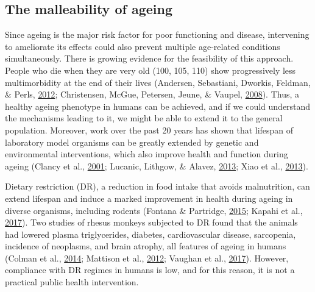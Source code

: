 \documentclass[12pt,twoside]{unicam}
\begin{document}
\hypertarget{the-malleability-of-ageing}{%
\subsection{The malleability of ageing}\label{the-malleability-of-ageing}}

Since ageing is the major risk factor for poor functioning and disease, intervening to ameliorate its effects could also prevent multiple age-related conditions simultaneously. There is growing evidence for the feasibility of this approach. People who die when they are very old (100, 105, 110) show progressively less multimorbidity at the end of their lives (Andersen, Sebastiani, Dworkis, Feldman, \& Perls, \protect\hyperlink{ref-Andersen2012}{2012}; Christensen, McGue, Petersen, Jeune, \& Vaupel, \protect\hyperlink{ref-Christensen2008}{2008}). Thus, a healthy ageing phenotype in humans can be achieved, and if we could understand the mechanisms leading to it, we might be able to extend it to the general population. Moreover, work over the past 20 years has shown that lifespan of laboratory model organisms can be greatly extended by genetic and environmental interventions, which also improve health and function during ageing (Clancy et al., \protect\hyperlink{ref-Clancy2001}{2001}; Lucanic, Lithgow, \& Alavez, \protect\hyperlink{ref-Lucanic2013}{2013}; Xiao et al., \protect\hyperlink{ref-Xiao2013}{2013}).

Dietary restriction (DR), a reduction in food intake that avoids malnutrition, can extend lifespan and induce a marked improvement in health during ageing in diverse organisms, including rodents (Fontana \& Partridge, \protect\hyperlink{ref-Fontana2015}{2015}; Kapahi et al., \protect\hyperlink{ref-Kapahi2017}{2017}). Two studies of rhesus monkeys subjected to DR found that the animals had lowered plasma triglycerides, diabetes, cardiovascular disease, sarcopenia, incidence of neoplasms, and brain atrophy, all features of ageing in humans (Colman et al., \protect\hyperlink{ref-Colman2014}{2014}; Mattison et al., \protect\hyperlink{ref-Mattison2012}{2012}; Vaughan et al., \protect\hyperlink{ref-Vaughan2017}{2017}). However, compliance with DR regimes in humans is low, and for this reason, it is not a practical public health intervention.
\end{document}
